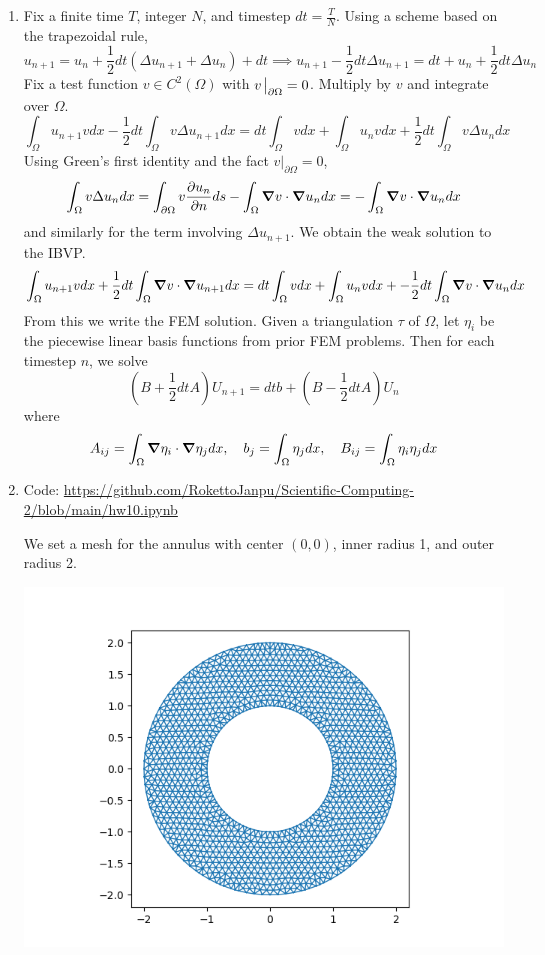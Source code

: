 \documentclass{article}
\newcommand{\br}[1]{\left(#1\right)}
\newcommand{\imp}{\implies}
\newcommand{\ptl}{\partial}
\begin{document}
\begin{enumerate}[label=(\alph*)]
	
\item Fix a finite time $T$, integer $N$, and timestep $dt=\frac TN$. Using a scheme based on the trapezoidal rule,
$$u_{n+1} = u_n + \frac12dt(\Delta u_{n+1}+\Delta u_n) + dt
\imp u_{n+1} - \frac12dt\Delta u_{n+1} = dt + u_n + \frac12dt\Delta u_n$$
Fix a test function $v\in C^2(\Omega)$ with $v\eval_{\ptl\Omega}=0$. Multiply by $v$ and integrate over $\Omega$.
$$\int_\Omega u_{n+1}vdx - \frac12dt\int_\Omega v\Delta u_{n+1}dx = dt\int_\Omega vdx + \int_\Omega u_nvdx + \frac12dt\int_\Omega v\Delta u_ndx$$
Using Green's first identity and the fact $v|_{\ptl\Omega}=0$,
$$\int_\Omega v\Delta u_ndx = \int_{\ptl\Omega}v\pdv{u_n}{n}ds - \int_\Omega\grad v\cdot\grad u_ndx
= -\int_\Omega\grad v\cdot\grad u_ndx$$
and similarly for the term involving $\Delta u_{n+1}$. We obtain the weak solution to the IBVP.
$$\int_\Omega u_{n+1}vdx + \frac12dt\int_\Omega\grad v\cdot\grad u_{n+1}dx = dt\int_\Omega vdx + \int_\Omega u_nvdx + -\frac12dt\int_\Omega\grad v\cdot\grad u_ndx$$
From this we write the FEM solution. Given a triangulation $\tau$ of $\Omega$, let $\eta_i$ be the piecewise linear basis functions from prior FEM problems. Then for each timestep $n$, we solve 
$$\br{B+\frac12dtA}U_{n+1} = dtb + \br{B-\frac12dtA}U_n$$
where
$$A_{ij} = \int_\Omega\grad\eta_i\cdot\grad\eta_jdx,
\quad b_j = \int_\Omega\eta_jdx,
\quad B_{ij} = \int_\Omega\eta_i\eta_jdx$$


\item Code: \url{https://github.com/RokettoJanpu/Scientific-Computing-2/blob/main/hw10.ipynb}

We set a mesh for the annulus with center $(0,0)$, inner radius 1, and outer radius 2.

\begin{center}
	\includegraphics[scale=.6]{hw10 mesh}
\end{center}


\end{enumerate}
\end{document}

